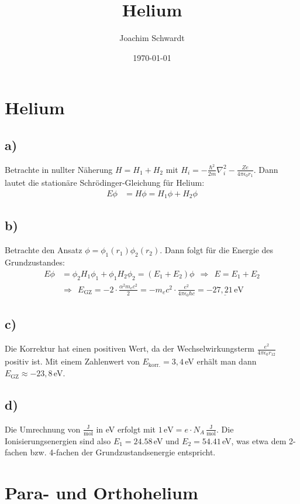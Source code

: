 \documentclass[a4paper,12pt]{article}
\newcommand{\kla}{}
\newcommand{\tecxt}{}
\begin{document}
\title{Helium}
\author{Joachim Schwardt}
\date{\today}
\maketitle

\section{Helium}
\subsection*{a)}
Betrachte in nullter Näherung $H=H_1+H_2$ mit $H_i=-\frac{\hbar^2}{2m}\nabla_i^2-\frac{Ze}{4\pi\epsilon_0r_1}$. Dann lautet die stationäre Schrödinger-Gleichung für Helium:
\begin{align*}
E\phi&=H\phi=H_1\phi +H_2\phi
\end{align*}
\subsection*{b)}
Betrachte den Ansatz $\phi=\phi_1(r_1)\phi_2(r_2)$. Dann folgt für die Energie des Grundzustandes:
\begin{align*}
E\phi&=\phi_2H_1\phi_1+\phi_1H_2\phi_2=\kla\left( {E_1+E_2} \right)\phi\ \ \Rightarrow\ \ E=E_1+E_2\\
&\Rightarrow\ \ E_\tecxt\text{GZ}=-2\cdot\frac{\alpha^2m_ec^2}{2}=-m_ec^2\cdot\frac{e^2}{4\pi\epsilon_0\hbar c}=\underline{-27,21\,\tecxt\text{eV}}
\end{align*}
\subsection*{c)}
Die Korrektur hat einen positiven Wert, da der Wechselwirkungsterm $\frac{e^2}{4\pi\epsilon_0 r_{12}}$ positiv ist. Mit einem Zahlenwert von $E_\tecxt\text{korr.}=3,4\,$eV erhält man dann $E_\tecxt\text{GZ}\approx -23,8\,$eV.
\subsection*{d)}
Die Umrechnung von $\frac{\tecxt\text{J}}{\tecxt\text{mol}}$ in eV erfolgt mit $1\,\tecxt\text{eV}=e\cdot N_A\,\frac{\tecxt\text{J}}{\tecxt\text{mol}}$. Die Ionisierungsenergien sind also $E_1=24.58\,$eV und $E_2=54.41\,$eV, was etwa dem 2-fachen bzw. 4-fachen der Grundzustandsenergie entspricht.
\section{Para- und Orthohelium}
\end{document}
